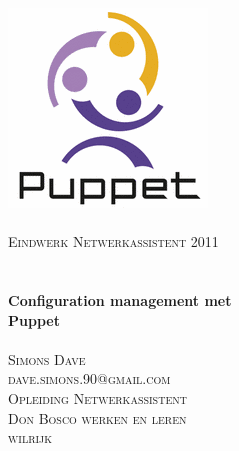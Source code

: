 \begin{titlepage}
\begin{center}

\includegraphics{src/puppet_logo.png}\\
\textsc{\Large }\\[2.5cm]

\textsc{\Large Eindwerk Netwerkassistent 2011}\\
\textsc{\Large }\\[-0.5cm]
\HRule\\
{\huge{\bfseries Configuration management met\\Puppet}}
\HRule\\
\textsc{\Large }\\[2.5cm]

\textsc{Simons Dave}\\
\textsc{dave.simons.90@gmail.com}\\
\textsc{Opleiding Netwerkassistent}\\
\textsc{Don Bosco werken en leren}\\
\textsc{wilrijk}\\

\end{center}
\end{titlepage}
